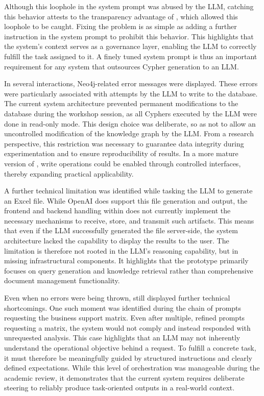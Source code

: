 Although this loophole in the system prompt was abused by the LLM, catching this behavior attests to the transparency advantage of \prototype{}, which allowed this loophole to be caught. Fixing the problem is as simple as adding a further instruction in the system prompt to prohibit this behavior. This highlights that the system's context serves as a governance layer, enabling the LLM to correctly fulfill the task assigned to it. A finely tuned system prompt is thus an important requirement for any system that outsources Cypher generation to an LLM.

In several interactions, Neo4j-related error messages were displayed. These errors were particularly associated with attempts by the LLM to write to the database. The current system architecture prevented permanent modifications to the database during the workshop session, as all Cyphers executed by the LLM were done in read-only mode. This design choice was deliberate, so as not to allow an uncontrolled modification of the knowledge graph by the LLM. From a research perspective, this restriction was necessary to guarantee data integrity during experimentation and to ensure reproducibility of results. In a more mature version of \prototype{}, write operations could be enabled through controlled interfaces, thereby expanding practical applicability.

A further technical limitation was identified while tasking the LLM to generate an Excel file. While OpenAI does support this file generation and output, the frontend and backend handling within \prototype{} does not currently implement the necessary mechanisms to receive, store, and transmit such artifacts. This means that even if the LLM successfully generated the file server-side, the system architecture lacked the capability to display the results to the user. The limitation is therefore not rooted in the LLM's reasoning capability, but in missing infrastructural components. It highlights that the prototype primarily focuses on query generation and knowledge retrieval rather than comprehensive document management functionality.

Even when no errors were being thrown, \prototype{} still displayed further technical shortcomings. One such moment was identified during the chain of prompts requesting the business support matrix. Even after multiple, refined prompts requesting a matrix, the system would not comply and instead responded with unrequested analysis. This case highlights that an LLM may not inherently understand the operational objective behind a request. To fulfill a concrete task, it must therefore be meaningfully guided by structured instructions and clearly defined expectations. While this level of orchestration was manageable during the academic review, it demonstrates that the current system requires deliberate steering to reliably produce task-oriented outputs in a real-world context.

